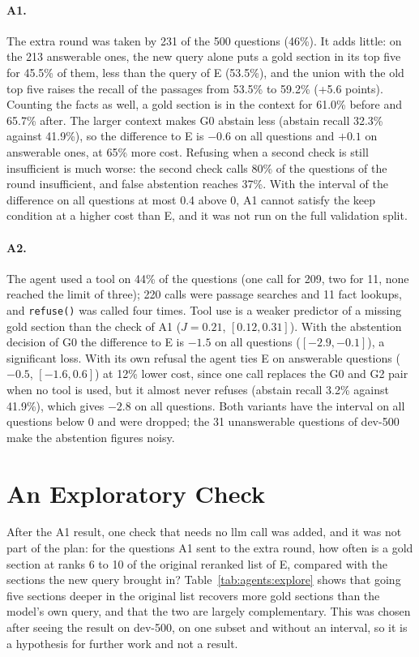 \paragraph{A1.} The extra round was taken by 231 of the 500 questions (46\%). It adds little: on the
213 answerable ones, the new query alone puts a gold section in its top five for 45.5\% of them,
less than the query of E (53.5\%), and the union with the old top five raises the recall of the
passages from 53.5\% to 59.2\% (+5.6 points). Counting the facts as well, a gold section is in the
context for 61.0\% before and 65.7\% after. The larger context makes G0 abstain less (abstain recall
32.3\% against 41.9\%), so the difference to E is $-0.6$ on all questions and $+0.1$ on answerable
ones, at 65\% more cost. Refusing when a second check is still insufficient is much worse: the
second check calls 80\% of the questions of the round insufficient, and false abstention reaches
37\%. With the interval of the difference on all questions at most 0.4 above 0, A1 cannot satisfy
the keep condition at a higher cost than E, and it was not run on the full validation split.

\paragraph{A2.} The agent used a tool on 44\% of the questions (one call for 209, two for 11, none
reached the limit of three); 220 calls were passage searches and 11 fact lookups, and
\texttt{refuse()} was called four times. Tool use is a weaker predictor of a missing gold section
than the check of A1 ($J = 0.21$, $[0.12, 0.31]$). With the abstention decision of G0 the difference
to E is $-1.5$ on all questions ($[-2.9, -0.1]$), a significant loss. With its own refusal the agent
ties E on answerable questions ($-0.5$, $[-1.6, 0.6]$) at 12\% lower cost, since one call replaces
the G0 and G2 pair when no tool is used, but it almost never refuses (abstain recall 3.2\% against
41.9\%), which gives $-2.8$ on all questions. Both variants have the interval on all questions below
0 and were dropped; the 31 unanswerable questions of dev-500 make the abstention figures noisy.


\section{An Exploratory Check}\label{sec:agents:explore}

After the A1 result, one check that needs no \gls{llm} call was added, and it was not part of the plan:
for the questions A1 sent to the extra round, how often is a gold section at ranks 6 to 10 of the
original reranked list of E, compared with the sections the new query brought in?
Table~\ref{tab:agents:explore} shows that going five sections deeper in the original list recovers more
gold sections than the model's own query, and that the two are largely complementary. This was
chosen after seeing the result on dev-500, on one subset and without an interval, so it is a
hypothesis for further work and not a result.

